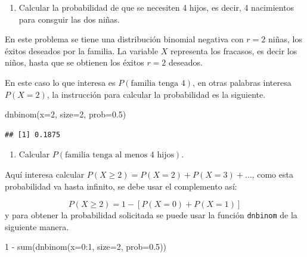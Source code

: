 \documentclass[
]{book}
\makeatletter
\newenvironment{Shaded}{\begin{snugshade}}{\end{snugshade}}
\newcommand{\AttributeTok}[1]{\textcolor[rgb]{0.77,0.63,0.00}{#1}}
\newcommand{\DecValTok}[1]{\textcolor[rgb]{0.00,0.00,0.81}{#1}}
\newcommand{\FloatTok}[1]{\textcolor[rgb]{0.00,0.00,0.81}{#1}}
\newcommand{\FunctionTok}[1]{\textcolor[rgb]{0.00,0.00,0.00}{#1}}
\newcommand{\NormalTok}[1]{#1}
\newcommand{\SpecialCharTok}[1]{\textcolor[rgb]{0.00,0.00,0.00}{#1}}
\providecommand{\tightlist}{%
  \setlength{\itemsep}{0pt}\setlength{\parskip}{0pt}}
\newenvironment{kframe}{%
\medskip{}
\setlength{\fboxsep}{.8em}
 \def\at@end@of@kframe{}%
 \ifinner\ifhmode%
  \def\at@end@of@kframe{\end{minipage}}%
  \begin{minipage}{\columnwidth}%
 \fi\fi%
 \def\FrameCommand##1{\hskip\@totalleftmargin \hskip-\fboxsep
 \colorbox{shadecolor}{##1}\hskip-\fboxsep
     \hskip-\linewidth \hskip-\@totalleftmargin \hskip\columnwidth}%
 \MakeFramed {\advance\hsize-\width
   \@totalleftmargin\z@ \linewidth\hsize
   \@setminipage}}%
 {\par\unskip\endMakeFramed%
 \at@end@of@kframe}
\renewenvironment{Shaded}{\begin{kframe}}{\end{kframe}}
\makeatother
\begin{document}
\begin{enumerate}
\def\labelenumi{\arabic{enumi})}
\tightlist
\item
  Calcular la probabilidad de que se necesiten 4 hijos, es decir, 4 nacimientos para consguir las dos niñas.
\end{enumerate}

En este problema se tiene una distribución binomial negativa con \(r=2\) niñas, los éxitos deseados por la familia. La variable \(X\) representa los fracasos, es decir los niños, hasta que se obtienen los éxitos \(r=2\) deseados.

En este caso lo que interesa es \(P(\text{familia tenga 4})\), en otras palabras interesa \(P(X=2)\), la instrucción para calcular la probabilidad es la siguiente.

\begin{Shaded}
\begin{Highlighting}[]
\FunctionTok{dnbinom}\NormalTok{(}\AttributeTok{x=}\DecValTok{2}\NormalTok{, }\AttributeTok{size=}\DecValTok{2}\NormalTok{, }\AttributeTok{prob=}\FloatTok{0.5}\NormalTok{)}
\end{Highlighting}
\end{Shaded}

\begin{verbatim}
## [1] 0.1875
\end{verbatim}

\begin{enumerate}
\def\labelenumi{\arabic{enumi})}
\setcounter{enumi}{1}
\tightlist
\item
  Calcular \(P(\text{familia tenga al menos 4 hijos})\).
\end{enumerate}

Aquí interesa calcular \(P(X \geq 2)=P(X=2)+P(X=3)+\ldots\), como esta probabilidad va hasta infinito, se debe usar el complemento así:

\[P(X \geq 2) = 1 - [P(X=0)+P(X=1)]\]
y para obtener la probabilidad solicitada se puede usar la función \texttt{dnbinom} de la siguiente manera.

\begin{Shaded}
\begin{Highlighting}[]
\DecValTok{1} \SpecialCharTok{{-}} \FunctionTok{sum}\NormalTok{(}\FunctionTok{dnbinom}\NormalTok{(}\AttributeTok{x=}\DecValTok{0}\SpecialCharTok{:}\DecValTok{1}\NormalTok{, }\AttributeTok{size=}\DecValTok{2}\NormalTok{, }\AttributeTok{prob=}\FloatTok{0.5}\NormalTok{))}
\end{Highlighting}
\end{Shaded}
\end{document}
